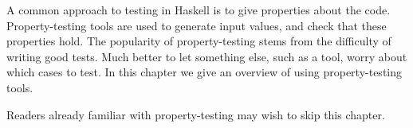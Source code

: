 \chapstart A common approach to testing in Haskell is to give properties about
the code.  Property-testing tools are used to generate input values, and check
that these properties hold.  The popularity of property-testing stems from the
difficulty of writing good tests.  Much better to let something else, such as a
tool, worry about which cases to test.  In this chapter we give an overview of
using property-testing tools.

Readers already familiar with property-testing may wish to skip this chapter.
